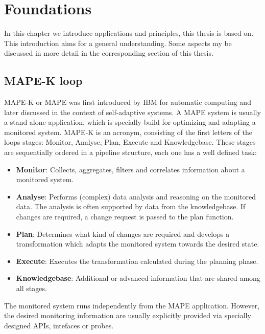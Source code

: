 \chapter{Foundations}
\label{ch:Foundations}

In this chapter we introduce applications and principles, this thesis is based on. This introduction aims for a general understanding. Some aspects my be discussed in more detail in the corresponding section of this thesis.

\section{MAPE-K loop}
\label{sec:Foundations:mape}

MAPE-K or MAPE was first introduced by IBM for automatic computing and later discussed in the context of self-adaptive systems. A MAPE system is usually a stand alone application, which is specially build for optimizing and adapting a monitored system. MAPE-K is an acronym, consisting of the first letters of the loops stages: Monitor, Analyse, Plan, Execute and Knowledgebase. These stages are sequentially ordered in a pipeline structure, each one has a well defined task:

\begin{itemize}
	\setlength\itemsep{0em}
	\item \textbf{Monitor}: Collects, aggregates, filters and correlates information about a monitored system.
	\item \textbf{Analyse}: Performs (complex) data analysis and reasoning on the monitored data. The analysis is often supported by data from the knowledgebase. If changes are required, a change request is passed to the plan function.
	\item \textbf{Plan}: Determines what kind of changes are required and develops a transformation which adapts the monitored system towards the desired state.
	\item \textbf{Execute}: Executes the transformation calculated during the planning phase.
	\item \textbf{Knowledgebase}: Additional or advanced information that are shared among all stages.
\end{itemize}

The monitored system runs independently from the MAPE application. However, the desired monitoring information are usually explicitly provided via specially designed APIs, intefaces or probes.



